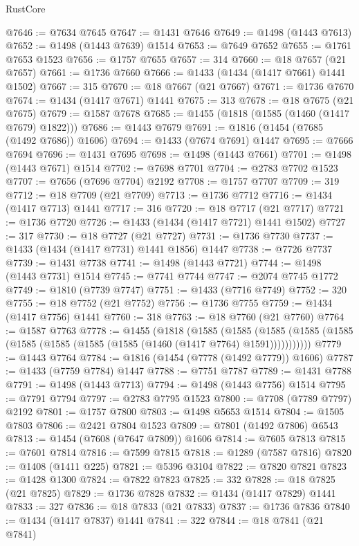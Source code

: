 \begin{lexlean}{RustCore}
\begin{coremodule}
@7646 := @7634 @7645
@7647 := @1431 @7646
@7649 := @1498 (@1443 @7613)
@7652 := @1498 (@1443 @7639) @1514
@7653 := @7649 @7652
@7655 := @1761 @7653 @1523
@7656 := @1757 @7655
@7657 := 314
@7660 := @18 @7657 (@21 @7657)
@7661 := @1736 @7660
@7666 := @1433 (@1434 (@1417 @7661) @1441 @1502)
@7667 := 315
@7670 := @18 @7667 (@21 @7667)
@7671 := @1736 @7670
@7674 := @1434 (@1417 @7671) @1441
@7675 := 313
@7678 := @18 @7675 (@21 @7675)
@7679 := @1587 @7678
@7685 := @1455 (@1818 (@1585 (@1460 (@1417 @7679) @1822)))
@7686 := @1443 @7679
@7691 := @1816 (@1454 (@7685 (@1492 @7686)) @1606)
@7694 := @1433 (@7674 @7691) @1447
@7695 := @7666 @7694
@7696 := @1431 @7695
@7698 := @1498 (@1443 @7661)
@7701 := @1498 (@1443 @7671) @1514
@7702 := @7698 @7701
@7704 := @2783 @7702 @1523
@7707 := @7656 (@7696 @7704) @2192
@7708 := @1757 @7707
@7709 := 319
@7712 := @18 @7709 (@21 @7709)
@7713 := @1736 @7712
@7716 := @1434 (@1417 @7713) @1441
@7717 := 316
@7720 := @18 @7717 (@21 @7717)
@7721 := @1736 @7720
@7726 := @1433 (@1434 (@1417 @7721) @1441 @1502)
@7727 := 317
@7730 := @18 @7727 (@21 @7727)
@7731 := @1736 @7730
@7737 := @1433 (@1434 (@1417 @7731) @1441 @1856) @1447
@7738 := @7726 @7737
@7739 := @1431 @7738
@7741 := @1498 (@1443 @7721)
@7744 := @1498 (@1443 @7731) @1514
@7745 := @7741 @7744
@7747 := @2074 @7745 @1772
@7749 := @1810 (@7739 @7747)
@7751 := @1433 (@7716 @7749)
@7752 := 320
@7755 := @18 @7752 (@21 @7752)
@7756 := @1736 @7755
@7759 := @1434 (@1417 @7756) @1441
@7760 := 318
@7763 := @18 @7760 (@21 @7760)
@7764 := @1587 @7763
@7778 := @1455
    (@1818
      (@1585
        (@1585
          (@1585 (@1585 (@1585 (@1585 (@1585 (@1585 (@1585 (@1460 (@1417 @7764) @1591)))))))))))
@7779 := @1443 @7764
@7784 := @1816 (@1454 (@7778 (@1492 @7779)) @1606)
@7787 := @1433 (@7759 @7784) @1447
@7788 := @7751 @7787
@7789 := @1431 @7788
@7791 := @1498 (@1443 @7713)
@7794 := @1498 (@1443 @7756) @1514
@7795 := @7791 @7794
@7797 := @2783 @7795 @1523
@7800 := @7708 (@7789 @7797) @2192
@7801 := @1757 @7800
@7803 := @1498 @5653 @1514
@7804 := @1505 @7803
@7806 := @2421 @7804 @1523
@7809 := @7801 (@1492 @7806) @6543
@7813 := @1454 (@7608 (@7647 @7809)) @1606
@7814 := @7605 @7813
@7815 := @7601 @7814
@7816 := @7599 @7815
@7818 := @1289 (@7587 @7816)
@7820 := @1408 (@1411 @225)
@7821 := @5396 @3104
@7822 := @7820 @7821
@7823 := @1428 @1300
@7824 := @7822 @7823
@7825 := 332
@7828 := @18 @7825 (@21 @7825)
@7829 := @1736 @7828
@7832 := @1434 (@1417 @7829) @1441
@7833 := 327
@7836 := @18 @7833 (@21 @7833)
@7837 := @1736 @7836
@7840 := @1434 (@1417 @7837) @1441
@7841 := 322
@7844 := @18 @7841 (@21 @7841)

\end{coremodule}
\end{lexlean}
